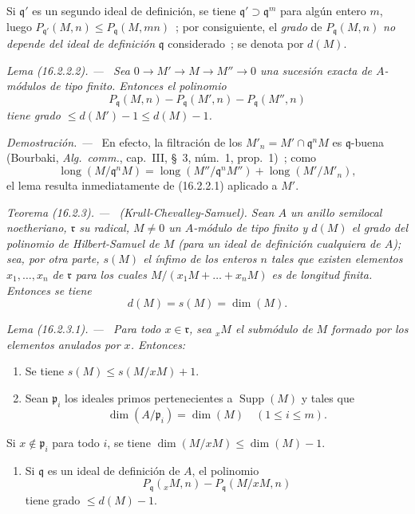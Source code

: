 \documentclass[10pt,oneside]{book}
\makeatletter
\newcommand{\setmanualcurrentlabel}[1]{\def\@currentlabel{#1}}
\newenvironment{theorem}[1][]{%
  \setmanualcurrentlabel{#1}\par\medskip\noindent\itshape Teorema (#1). ---\ }{\par}
\newenvironment{lemma}[1][]{%
  \setmanualcurrentlabel{#1}\par\medskip\noindent\itshape Lema (#1). ---\ }{\par}
\newenvironment{proof}{%
  \par\medskip\noindent\textit{Demostración. ---\ }}{\par}
\providecommand{\setmin}{-}%
\makeatother
\begin{document}
Si $\mathfrak{q}'$ es un segundo ideal de definición, se tiene
$\mathfrak{q}'\supset\mathfrak{q}^m$ para algún entero $m$, luego
$P_{\mathfrak{q}'}(M,n)\leq P_{\mathfrak{q}}(M,mn)$~; por consiguiente, el
\emph{grado} de $P_{\mathfrak{q}}(M,n)$ \emph{no depende del ideal de definición}
$\mathfrak{q}$ considerado~; se denota por $d(M)$.

\begin{lemma}[16.2.2.2]
\label{0.16.2.2.2-es}
Sea $0\to M'\to M\to M''\to0$ una sucesión exacta de $A$-módulos de tipo
finito. Entonces el polinomio
\[
  P_{\mathfrak{q}}(M,n)\setmin P_{\mathfrak{q}}(M',n)
  \setmin P_{\mathfrak{q}}(M'',n)
\]
tiene grado $\leq d(M')\setmin 1\leq d(M)\setmin 1$.
\end{lemma}

\begin{proof}
En efecto, la filtración de los
$M'_n=M'\cap\mathfrak{q}^nM$ es $\mathfrak{q}$-buena (Bourbaki,
\emph{Alg.~comm.}, cap.~III, \S~3, núm.~1, prop.~1)~; como
\[
  \operatorname{long}(M/\mathfrak{q}^nM)
  =\operatorname{long}(M''/\mathfrak{q}^nM'')
  +\operatorname{long}(M'/M'_n),
\]
el lema resulta inmediatamente de (16.2.2.1) aplicado a $M'$.
\end{proof}

\begin{theorem}[16.2.3]
\label{0.16.2.3-es}
\textup{(Krull-Chevalley-Samuel).}
Sean $A$ un anillo semilocal noetheriano, $\mathfrak{r}$ su radical,
$M\neq0$ un $A$-módulo de tipo finito y $d(M)$ el grado del polinomio de
Hilbert-Samuel de $M$ (para un ideal de definición cualquiera de $A$); sea,
por otra parte, $s(M)$ el ínfimo de los enteros $n$ tales que existen elementos
$x_1,\ldots,x_n$ de $\mathfrak{r}$ para los cuales
$M/(x_1M+\ldots+x_nM)$ es de longitud finita. Entonces se tiene
\[
  d(M)=s(M)=\dim(M).
\]
\end{theorem}

\begin{lemma}[16.2.3.1]
\label{0.16.2.3.1-es}
Para todo $x\in\mathfrak{r}$, sea ${}_xM$ el submódulo de $M$ formado por los
elementos anulados por $x$. Entonces:
\begin{enumerate}
  \item[\rm{(i)}] Se tiene $s(M)\leq s(M/xM)+1$.
  \item[\rm{(ii)}] Sean $\mathfrak{p}_i$ los ideales primos pertenecientes a
  $\operatorname{Supp}(M)$ y tales que
  \[
    \dim(A/\mathfrak{p}_i)=\dim(M)\quad(1\leq i\leq m).
  \]
\end{enumerate}
Si $x\notin\mathfrak{p}_i$ para todo $i$, se tiene
$\dim(M/xM)\leq\dim(M)\setmin 1$.
\begin{enumerate}
  \item[\rm{(iii)}] Si $\mathfrak{q}$ es un ideal de definición de $A$, el
  polinomio
  \[
    P_{\mathfrak{q}}({}_xM,n)\setmin P_{\mathfrak{q}}(M/xM,n)
  \]
  tiene grado $\leq d(M)\setmin 1$.
\end{enumerate}
\end{lemma}
\end{document}

